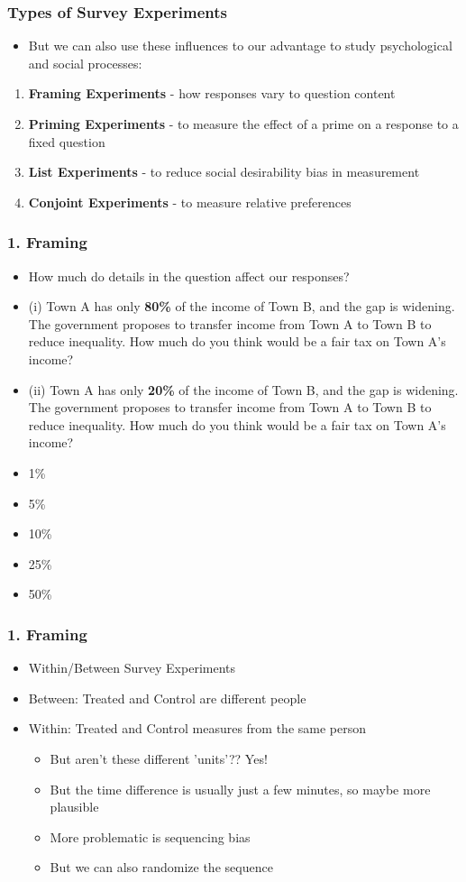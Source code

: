 \documentclass[xcolor=x11names,compress]{beamer}\usepackage[]{graphicx}\usepackage[]{color}
\renewcommand{\(}{\begin{columns}}
\renewcommand{\)}{\end{columns}}
\newcommand{\<}[1]{\begin{column}{#1}}
\renewcommand{\>}{\end{column}}
\begin{document}
\begin{frame}
\frametitle{Types of Survey Experiments}
\begin{itemize}
\item But we can also use these influences to our advantage to study psychological and social processes:
\pause
\end{itemize}
\begin{enumerate}
\item \textbf{Framing Experiments} - how responses vary to question content
\pause
\item \textbf{Priming Experiments} - to measure the effect of a prime on a response to a fixed question
\pause
\item \textbf{List Experiments} - to reduce social desirability bias in measurement
\pause
\item \textbf{Conjoint Experiments} - to measure relative preferences
\end{enumerate}
\end{frame}

\begin{frame}
\frametitle{1. Framing}
\begin{itemize}
\item How much do details in the question affect our responses?
\pause
\item (i) Town A has only \textbf{80\%} of the income of Town B, and the gap is widening. The government proposes to transfer income from Town A to Town B to reduce inequality. How much do you think would be a fair tax on Town A's income?
\pause
\item (ii) Town A has only \textbf{20\%} of the income of Town B, and the gap is widening. The government proposes to transfer income from Town A to Town B to reduce inequality. How much do you think would be a fair tax on Town A's income?
\pause
\item 1\%
\item 5\%
\item 10\%
\item 25\%
\item 50\%
\end{itemize}
\end{frame}

\begin{frame}
\frametitle{1. Framing}
\begin{itemize}
\item Within/Between Survey Experiments
\pause
\item Between: Treated and Control are different people
\pause
\item Within: Treated and Control measures from the same person
\begin{itemize}
\item But aren't these different 'units'?? \pause Yes!
\pause
\item But the time difference is usually just a few minutes, so maybe more plausible
\pause
\item More problematic is sequencing bias
\pause
\item But we can also randomize the sequence
\end{itemize}
\end{itemize}
\end{frame}
\end{document}
